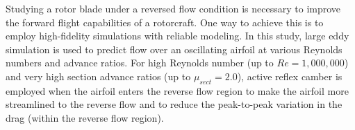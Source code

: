 Studying a rotor blade under a reversed flow condition
is necessary to improve the forward flight capabilities of a rotorcraft.
One way to achieve this is to employ high-fidelity simulations with reliable modeling.
In this study, large eddy simulation is used to predict flow over an oscillating airfoil at various Reynolds numbers and advance ratios.
For high Reynolds number (up to $Re=1,000,000$) and very high section advance ratios (up to $\mu_{sect}=2.0$), active reflex camber is employed when the airfoil enters
the reverse flow region to make the airfoil more streamlined to the reverse flow and to reduce
the peak-to-peak variation in the drag (within the reverse flow region).



